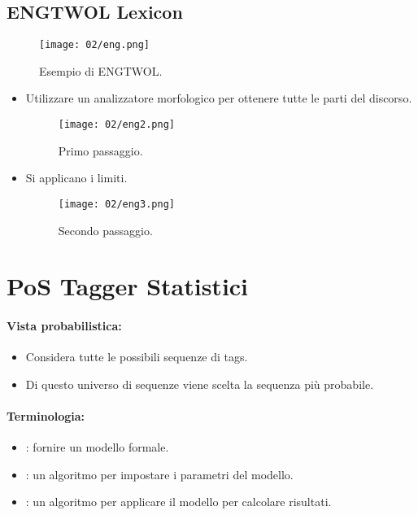 \subsection{ENGTWOL Lexicon}

\begin{figure}[h]
    \centering
    \texttt{[image: 02/eng.png]}
    \caption{Esempio di ENGTWOL.}
\end{figure}

\begin{itemize}
  \item Utilizzare un analizzatore morfologico per ottenere tutte le parti del discorso. 
\begin{figure}[h]
    \centering
    \texttt{[image: 02/eng2.png]}
    \caption{Primo passaggio.}
\end{figure}
\item Si applicano i limiti. 
\begin{figure}[h]
    \centering
    \texttt{[image: 02/eng3.png]}
    \caption{Secondo passaggio.}
\end{figure}
\end{itemize}

\section{PoS Tagger Statistici}


\paragraph{Vista probabilistica:}

\begin{itemize}
  \item Considera tutte le possibili sequenze di tags. 
  \item Di questo universo di sequenze viene scelta la sequenza più probabile.
\end{itemize}

\paragraph{Terminologia:}

\begin{itemize}
  \item {}: fornire un modello formale. 
  \item {}: un algoritmo per impostare i parametri del modello. 
  \item {}: un algoritmo per applicare il modello per calcolare risultati.
\end{itemize}

